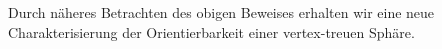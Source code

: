 \documentclass[12pt,titlepage,twoside,cleardoublepage]{article}
\theoremstyle{nummermitklammern}
\newtheorem{bemerkung}[temp]{Bemerkung}
\newtheorem{satz}[temp]{Satz}
\newtheorem{bemerkung}[zahl]{Bemerkung}
\newtheorem{satz}[zahl]{Satz}
\numberwithin{equation}{section}
\begin{document}
Durch näheres Betrachten des obigen Beweises erhalten wir eine neue Charakterisierung der Orientierbarkeit einer vertex-treuen Sphäre.
\begin{comment}
\begin{bemerkung}
Um den folgenden Beweis einfacher zu Gestalten  führt man folgende Vereinfachung ein: Falls Sphären $X$ und $Y$ isomorph sind, nehmen wir $X=Y$ bezüglich ihrer Mengen und Relationen an. 
 
\end{bemerkung}
\begin{satz}
Sei $X$ eine Sphäre mit $n$ Flächen ohne Ecken vom Grad 2. Dann existiert eine Kantensequenz $E=(e_1,\ldots,e_m)$ in $X,$ sodass  $X^E$ zum Double n-gon isomorph ist. Zudem ist für alle  $1\leq i\leq k$ in der simplizialen Fläche $X^{(e_1,\ldots,e_i)}$ keine Ecke vom Grad 2 enthalten.
\end{satz}
\begin{proof}

Man führt den Beweis induktiv. 
Für $n=4,6$ ist nichts zu zeigen. Also sei $n>6$. Falls $X\cong (n)^2$ ist, ist nichts zu zeigen. Deshalb nimmt man an, das $X$ nicht zum $(n)^2$ isomorph ist. Ziel ist es eine Ecke vom Grad 3 durch Kantendrehungen zu erzeugen. Falls $X$ keine Ecke mit Flächengrad 3 hat, dann wählt man eine Ecke $V$ in $X$, die 
\[
deg_X(V)\leq deg_X(V') \text{ für alle }V'\in X_0
\]
erfüllt. Sei also hierzu $X_1(V)=\{e_1,\ldots,e_m\}$ die Menge der Kanten, die zu $V$ inzident sind. Dann ist $X^{e_1}$ eine simpliziale Fläche mit 
\[
deg_{X^{e_1}}(V')=deg_{X}(V')-1 \text{ für } V'\in X_0(e_1)
\]
Falls diese Kantendrehung keine Ecke vom Grad 3 erzeugt hat, wiederholt man die obige Prozedur mit einer der Kanten in $X^{e_1}_1(V)=\{e_2,\ldots,e_{m}\}$. Nach endlich vielen Schritten erhält man eine durch Kantendrehungen entstandene simpliziale Fläche Y mit einer Ecke $V^*$ vom Grad 3. Also kann man ohne Einschränkung der Allgemeinheit annehmen, dass $X$ eine Ecke vom Grad 3 hat. Außerdem gilt für $V'\in X_0(X_2(V^*))$, dass $deg(V')>3$ ist, da $Y$ nicht zum Tetraeder isomorph ist. Man definiert nun $Z$ als die simpliziale Fläche, die durch Entfernen des Tetraeders an $V^*$ entsteht, also $Z={}_{V*}T(X)$. Da $\vert Z_2 \vert =n-2$ ist, existiert nach Induktionsvoraussetzung eine Kantensequenz $E=(e_1,\ldots,e_m)$ in $Z\subset X$, sodass 
\[
Z^E\cong (n-1)^2
\]
ist. 


\end{comment}
\end{document}

